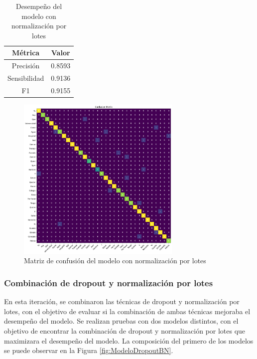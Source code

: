 \begin{table}[H]
    \centering
    \begin{tabular}{|c|c|}
        \hline
        \textbf{Métrica} & \textbf{Valor} \\
        \hline
        Precisión & 0.8593 \\
        \hline
        Sensibilidad & 0.9136 \\
        \hline
        F1 & 0.9155 \\
        \hline
    \end{tabular}
    \caption{Desempeño del modelo con normalización por lotes}
    \label{tab:DesempeñoModeloBatchNormalization}
\end{table}

\begin{figure}[H]
    \centering
    \includegraphics[width=0.7\textwidth]{figuras/modelBNCM.png}
    \caption{Matriz de confusión del modelo con normalización por lotes}
    \label{fig:CMModeloBatchNormalization}
\end{figure}

\subsubsection{Combinación de dropout y normalización por lotes}

En esta iteración, se combinaron las técnicas de dropout y normalización por lotes, con el objetivo de evaluar si la combinación de ambas técnicas mejoraba el desempeño del modelo.
Se realizan pruebas con dos modelos distintos, con el objetivo de encontrar la combinación de dropout y normalización por lotes que maximizara el desempeño del modelo.
La composición del primero de los modelos se puede observar en la Figura \ref{fig:ModeloDropoutBN}.


